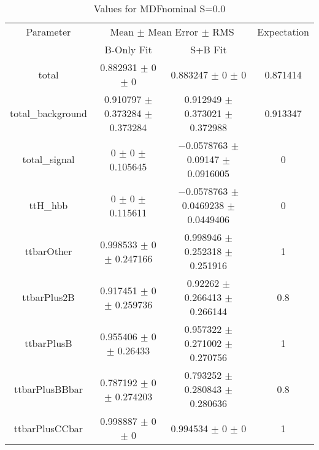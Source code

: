 \begin{table}
\centering
\caption{Values for MDFnominal S=0.0}
\begin{tabular}{cccc}
\toprule
Parameter & \multicolumn{2}{c}{Mean $\pm$ Mean Error $\pm$ RMS} & Expectation\\
 & B-Only Fit & S+B Fit & \\
\midrule
total & \num{0.882931} $\pm$ \num{0} $\pm$ \num{0} & \num{0.883247} $\pm$ \num{0} $\pm$ \num{0} & \num{0.871414}\\
total\_background & \num{0.910797} $\pm$ \num{0.373284} $\pm$ \num{0.373284} & \num{0.912949} $\pm$ \num{0.373021} $\pm$ \num{0.372988} & \num{0.913347}\\
total\_signal & \num{0} $\pm$ \num{0} $\pm$ \num{0.105645} & \num{-0.0578763} $\pm$ \num{0.09147} $\pm$ \num{0.0916005} & \num{0}\\
ttH\_hbb & \num{0} $\pm$ \num{0} $\pm$ \num{0.115611} & \num{-0.0578763} $\pm$ \num{0.0469238} $\pm$ \num{0.0449406} & \num{0}\\
ttbarOther & \num{0.998533} $\pm$ \num{0} $\pm$ \num{0.247166} & \num{0.998946} $\pm$ \num{0.252318} $\pm$ \num{0.251916} & \num{1}\\
ttbarPlus2B & \num{0.917451} $\pm$ \num{0} $\pm$ \num{0.259736} & \num{0.92262} $\pm$ \num{0.266413} $\pm$ \num{0.266144} & \num{0.8}\\
ttbarPlusB & \num{0.955406} $\pm$ \num{0} $\pm$ \num{0.26433} & \num{0.957322} $\pm$ \num{0.271002} $\pm$ \num{0.270756} & \num{1}\\
ttbarPlusBBbar & \num{0.787192} $\pm$ \num{0} $\pm$ \num{0.274203} & \num{0.793252} $\pm$ \num{0.280843} $\pm$ \num{0.280636} & \num{0.8}\\
ttbarPlusCCbar & \num{0.998887} $\pm$ \num{0} $\pm$ \num{0} & \num{0.994534} $\pm$ \num{0} $\pm$ \num{0} & \num{1}\\
\bottomrule
\end{tabular}
\end{table}